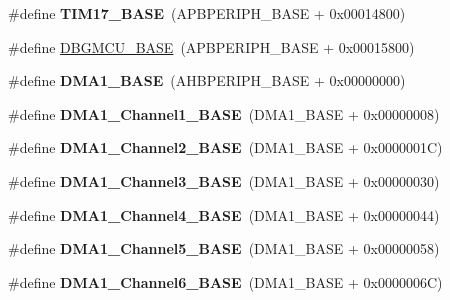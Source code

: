 \begin{DoxyCompactItemize}
\#define {\bfseries T\+I\+M17\+\_\+\+B\+A\+SE}~(A\+P\+B\+P\+E\+R\+I\+P\+H\+\_\+\+B\+A\+SE + 0x00014800)
\item 
\#define \hyperlink{group___peripheral__memory__map_ga4adaf4fd82ccc3a538f1f27a70cdbbef}{D\+B\+G\+M\+C\+U\+\_\+\+B\+A\+SE}~(A\+P\+B\+P\+E\+R\+I\+P\+H\+\_\+\+B\+A\+SE + 0x00015800)
\item 
\mbox{\label{group___peripheral__memory__map_gab2d8a917a0e4ea99a22ac6ebf279bc72}} 
\#define {\bfseries D\+M\+A1\+\_\+\+B\+A\+SE}~(A\+H\+B\+P\+E\+R\+I\+P\+H\+\_\+\+B\+A\+SE + 0x00000000)
\item 
\mbox{\label{group___peripheral__memory__map_ga888dbc1608243badeb3554ffedc7364c}} 
\#define {\bfseries D\+M\+A1\+\_\+\+Channel1\+\_\+\+B\+A\+SE}~(D\+M\+A1\+\_\+\+B\+A\+SE + 0x00000008)
\item 
\mbox{\label{group___peripheral__memory__map_ga38a70090eef3687e83fa6ac0c6d22267}} 
\#define {\bfseries D\+M\+A1\+\_\+\+Channel2\+\_\+\+B\+A\+SE}~(D\+M\+A1\+\_\+\+B\+A\+SE + 0x0000001\+C)
\item 
\mbox{\label{group___peripheral__memory__map_ga70b3d9f36ca9ce95b4e421c11154fe5d}} 
\#define {\bfseries D\+M\+A1\+\_\+\+Channel3\+\_\+\+B\+A\+SE}~(D\+M\+A1\+\_\+\+B\+A\+SE + 0x00000030)
\item 
\mbox{\label{group___peripheral__memory__map_ga1adc93cd0baf0897202c71110e045692}} 
\#define {\bfseries D\+M\+A1\+\_\+\+Channel4\+\_\+\+B\+A\+SE}~(D\+M\+A1\+\_\+\+B\+A\+SE + 0x00000044)
\item 
\mbox{\label{group___peripheral__memory__map_gac041a71cd6c1973964f847a68aa14478}} 
\#define {\bfseries D\+M\+A1\+\_\+\+Channel5\+\_\+\+B\+A\+SE}~(D\+M\+A1\+\_\+\+B\+A\+SE + 0x00000058)
\item 
\mbox{\label{group___peripheral__memory__map_ga896c2c7585dd8bc3969cf8561f689d2d}} 
\#define {\bfseries D\+M\+A1\+\_\+\+Channel6\+\_\+\+B\+A\+SE}~(D\+M\+A1\+\_\+\+B\+A\+SE + 0x0000006\+C)
\item 
\mbox{\label{group___peripheral__memory__map_gaeee0d1f77d0db1db533016a09351166c}} 

\end{DoxyCompactItemize}
